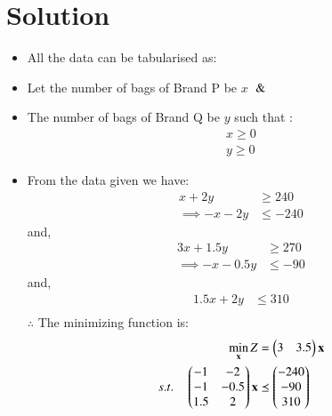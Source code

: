 \documentclass[journal,12pt,twocolumn]{IEEEtran}
\begin{document}
\section{Solution}
\begin{itemize}
\item All the data can be tabularised as:
\begin{table}[!ht]
\centering
{}
\caption{Requirements of fertilizers}
\label{tab:table2}
\end{table}
\item Let the number of bags of Brand P be $x$ $\And$
\item The number of bags of Brand Q be $y$ such that : 
\begin{align}
    x \geq 0 
    \\
    y \geq 0 
\end{align}
\item From the data given we have:
\begin{align}
    x+2y &\geq 240 \\
   \implies   -x-2y &\leq -240
\end{align}
and,
\begin{align}
    3x+1.5y &\geq 270 \\
    \implies -x-0.5y &\leq -90
\end{align}
and,
\begin{align}
     1.5x+2y &\leq 310 \\
\end{align}
$\therefore$ The minimizing function is:
\begin{align}
        \min_{\vec{x}} Z &= \myvec{3& 3.5}\vec{x}\\
        s.t. \quad 
        \myvec{-1 & -2\\ -1 & -0.5 \\ 1.5 & 2 }\vec{x} &\preceq \myvec{-240\\-90\\310} \\

\end{align}
\end{itemize}
\end{document}
